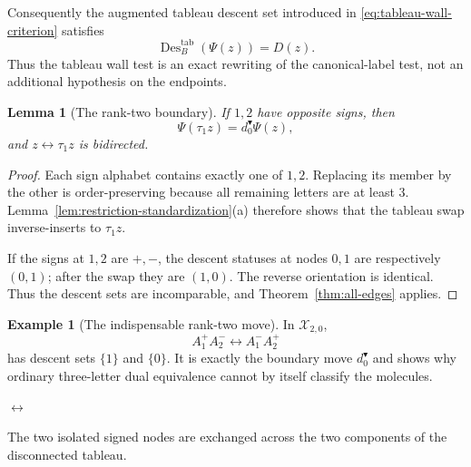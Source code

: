 \documentclass[11pt]{article}
\newtheorem{lemma}[theorem]{Lemma}
\theoremstyle{definition}
\newtheorem{example}[theorem]{Example}
\theoremstyle{remark}
\newcommand{\Des}{\operatorname{Des}}
\newcommand{\cX}{\mathcal X}
\begin{document}
Consequently the augmented tableau descent set introduced in
\eqref{eq:tableau-wall-criterion} satisfies
\[
                     \Des_B^{\mathrm{tab}}(\Psi(z))=D(z).
\]
Thus the tableau wall test is an exact rewriting of the canonical-label
test, not an additional hypothesis on the endpoints.

\begin{lemma}[The rank-two boundary]
\label{lem:boundary}
If $1,2$ have opposite signs, then
\[
                     \Psi(\tau_1z)=d_0^{\blacktriangledown}\Psi(z),
\]
and $z\leftrightarrow\tau_1z$ is bidirected.
\end{lemma}

\begin{proof}
Each sign alphabet contains exactly one of $1,2$.  Replacing its member by
the other is order-preserving because all remaining letters are at least
$3$.  Lemma~\ref{lem:restriction-standardization}(a) therefore shows that
the tableau swap inverse-inserts to $\tau_1z$.

If the signs at $1,2$ are $+,-$, the descent statuses at nodes $0,1$ are
respectively $(0,1)$; after the swap they are $(1,0)$.  The reverse
orientation is identical.  Thus the descent sets are incomparable, and
Theorem~\ref{thm:all-edges} applies.
\end{proof}

\begin{example}[The indispensable rank-two move]
In $\cX_{2,0}$,
\[
                 A_1^+A_2^-\longleftrightarrow A_1^-A_2^+
\]
has descent sets $\{1\}$ and $\{0\}$.  It is exactly the boundary move
$d_0^{\blacktriangledown}$ and shows why ordinary three-letter dual equivalence
cannot by itself classify the molecules.
\begin{center}
\quad $\longleftrightarrow$ \quad
{}

{\small The two isolated signed nodes are exchanged across the two
components of the disconnected tableau.}
\end{center}
\end{example}
\end{document}
